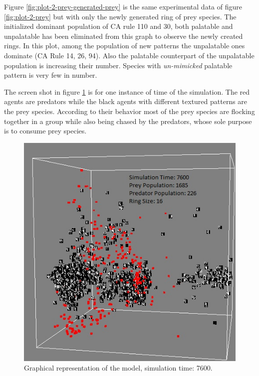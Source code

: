 \documentclass[letterpaper]{article}
\numberwithin{equation}{section}
\begin{document}
Figure \ref{fig:plot-2-prey-generated-prey} is the same experimental data of figure \ref{fig:plot-2-prey} but with only the newly generated ring of prey species. The initialized dominant population of CA rule 110 and 30, both palatable and unpalatable has been eliminated from this graph to observe the newly created rings. In this plot, among the population of new patterns the unpalatable ones dominate (CA Rule 14, 26, 94). Also the palatable counterpart of the unpalatable population is increasing their number. Species with \textsl{un-mimicked} palatable pattern is very few in number.

The screen shot in figure \ref{fig:screenshot-simTime7600-2-prey} is for one instance of time of the simulation. The red agents are predators while the black agents with different textured patterns are the prey species. According to their behavior most of the prey species are flocking together in a group while also being chased by the predators, whose sole purpose is to consume prey species. 

\begin{figure}[H]
	\centering
	\label{fig:screenshot-simTime7600-2-prey}
	\includegraphics[scale=0.55]{../tex/images/simTime7600}
	\caption[Graphical representation of the model (simulation time: 7600)]{Graphical representation of the model, simulation time: 7600.}
\end{figure}
\end{document}
